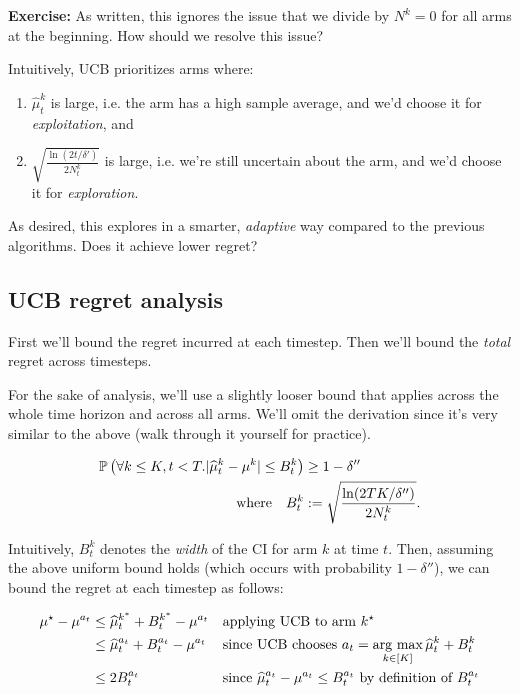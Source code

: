 \documentclass[\main/main]{subfiles}
\begin{document}
\textbf{Exercise:} As written, this ignores the issue that we divide by $N^k = 0$ for all arms at the beginning. How should we resolve this issue?

Intuitively, UCB prioritizes arms where:

\begin{enumerate}
    \item $\hat \mu^k_t$ is large, i.e. the arm has a high sample average, and we'd choose it for \emph{exploitation}, and
    \item $\sqrt{\frac{\ln(2t/\delta')}{2N^k_t}}$ is large, i.e. we're still uncertain about the arm, and we'd choose it for \emph{exploration}.
\end{enumerate}

As desired, this explores in a smarter, \emph{adaptive} way compared to the previous algorithms. Does it achieve lower regret?

\subsection{UCB regret analysis}

First we'll bound the regret incurred at each timestep. Then we'll bound the \emph{total} regret across timesteps.

For the sake of analysis, we'll use a slightly looser bound that applies across the whole time horizon and across all arms. We'll omit the derivation since it's very similar to the above (walk through it yourself for practice).

\begin{align*}
    \P\left(\forall k \le K, t < T. |\hat \mu^k_t - \mu^k | \le B^k_t \right) & \ge 1-\delta''                              \\
    \text{where} \quad B^k_t                                                  & := \sqrt{\frac{\ln(2TK/\delta'')}{2N^k_t}}.
\end{align*}

Intuitively, $B^k_t$ denotes the \emph{width} of the CI for arm $k$ at time $t$. Then, assuming the above uniform bound holds (which occurs with probability $1-\delta''$), we can bound the regret at each timestep as follows:

\begin{align*}
    \mu^\star - \mu^{a_t} & \le \hat \mu^{k^*}_t + B_t^{k^*} - \mu^{a_t} &  & \text{applying UCB to arm } k^\star                                                          \\
                          & \le \hat \mu^{a_t}_t + B^{a_t}_t - \mu^{a_t} &  & \text{since UCB chooses } a_t = \argmax_{k \in [K]} \hat \mu^k_t + B_t^{k}                   \\
                          & \le 2 B^{a_t}_t                              &  & \text{since } \hat \mu^{a_t}_t - \mu^{a_t} \le B^{a_t}_t \text{ by definition of } B^{a_t}_t \\
\end{align*}
\end{document}
